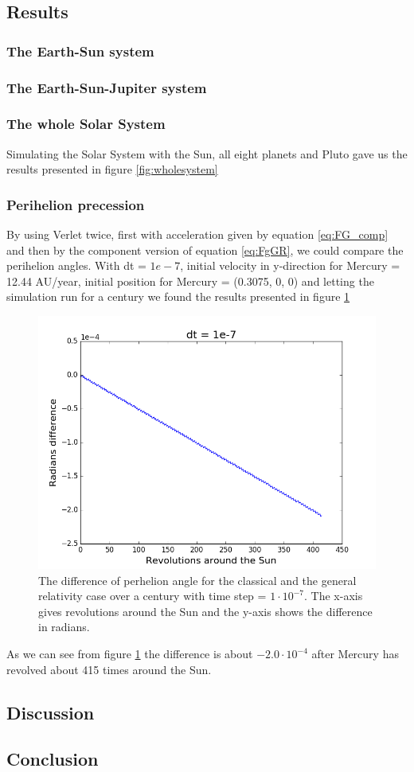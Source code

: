\documentclass{article}
\newcommand{\E}[1]{\cdot 10^{#1}}
\begin{document}
\subsection{Results}
\subsubsection*{The Earth-Sun system}

\subsubsection*{The Earth-Sun-Jupiter system}
\subsubsection*{The whole Solar System}
Simulating the Solar System with the Sun, all eight planets and Pluto gave us the results presented in figure \ref{fig:wholesystem}
\subsubsection*{Perihelion precession}
By using Verlet twice, first with acceleration given by equation \eqref{eq:FG_comp} and then by the component version of equation \eqref{eq:FgGR}, we could compare the perihelion angles. With dt = $1e-7$, initial velocity in y-direction for Mercury = 12.44 AU/year, initial position for Mercury = (0.3075, 0, 0) and letting the simulation run for a century we found the results presented in figure \ref{fig:perhelion}
\begin{figure}[H]
\centering
\includegraphics[scale=0.5]{../figures/perheliondt1e-7.png}
\caption{The difference of perhelion angle for the classical and the general relativity case over a century with time step = $1\E{-7}$. The x-axis gives revolutions around the Sun and the y-axis shows the difference in radians.}
\label{fig:perhelion}
\end{figure}
As we can see from figure \ref{fig:perhelion} the difference is about $-2.0 \E{-4}$ after Mercury has revolved about 415 times around the Sun. 
\subsection{Discussion}
\subsection{Conclusion}
\end{document}
